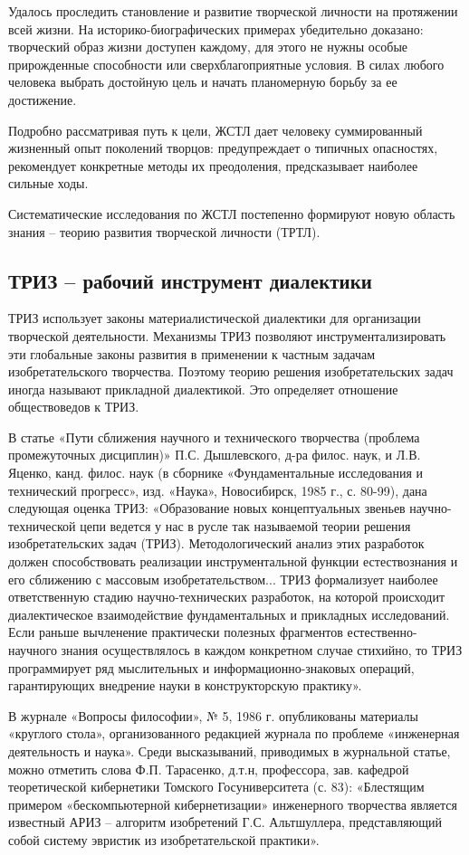 \documentclass[11pt,a4paper]{article}
\begin{document}
Удалось проследить становление и развитие творческой личности на протяжении
всей жизни. На историко-биографических примерах убедительно доказано:
творческий образ жизни доступен каждому, для этого не нужны особые
прирожденные способности или сверхблагоприятные условия. В силах любого
человека выбрать достойную цель и начать планомерную борьбу за ее достижение.

Подробно рассматривая путь к цели, ЖСТЛ дает человеку суммированный жизненный
опыт поколений творцов: предупреждает о типичных опасностях, рекомендует
конкретные методы их преодоления, предсказывает наиболее сильные ходы.

Систематические исследования по ЖСТЛ постепенно формируют новую область знания
-- теорию развития творческой личности (ТРТЛ).

\subsection{ТРИЗ -- рабочий инструмент диалектики}

ТРИЗ использует законы материалистической диалектики для организации
творческой деятельности. Механизмы ТРИЗ позволяют инструментализировать эти
глобальные законы развития в применении к частным задачам изобретательского
творчества. Поэтому теорию решения изобретательских задач иногда называют
прикладной диалектикой. Это определяет отношение обществоведов к ТРИЗ.

В статье «Пути сближения научного и технического творчества (проблема
промежуточных дисциплин)» П.С. Дышлевского, д-ра филос. наук, и Л.В. Яценко,
канд. филос. наук (в сборнике «Фундаментальные исследования и технический
прогресс», изд. «Наука», Новосибирск, 1985 г., с. 80-99), дана следующая
оценка ТРИЗ: «Образование новых концептуальных звеньев научно-технической цепи
ведется у нас в русле так называемой теории решения изобретательских задач
(ТРИЗ). Методологический анализ этих разработок должен способствовать
реализации инструментальной функции естествознания и его сближению с массовым
изобретательством... ТРИЗ формализует наиболее ответственную стадию
научно-технических разработок, на которой происходит диалектическое
взаимодействие фундаментальных и прикладных исследований. Если раньше
вычленение практически полезных фрагментов естественно-научного знания
осуществлялось в каждом конкретном случае стихийно, то ТРИЗ программирует ряд
мыслительных и информационно-знаковых операций, гарантирующих внедрение науки
в конструкторскую практику».

В журнале «Вопросы философии», № 5, 1986 г. опубликованы материалы «круглого
стола», организованного редакцией журнала по проблеме «инженерная деятельность
и наука». Среди высказываний, приводимых в журнальной статье, можно отметить
слова Ф.П. Тарасенко, д.т.н, профессора, зав. кафедрой теоретической
кибернетики Томского Госуниверситета (с. 83): «Блестящим примером
«бескомпьютерной кибернетизации» инженерного творчества является известный
АРИЗ -- алгоритм изобретений Г.С. Альтшуллера, представляющий собой систему
эвристик из изобретательской практики».
\end{document}
